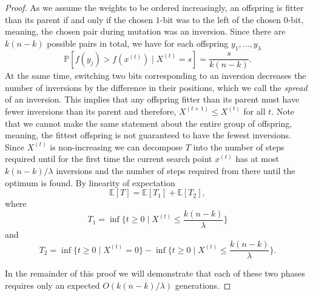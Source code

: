 \begin{proof}
    As we assume the weights to be ordered increasingly, an offspring is fitter than its parent if and only if the chosen $1$-bit was to the left of the chosen $0$-bit, meaning, the chosen pair during mutation was an inversion. Since there are $k(n-k)$ possible pairs in total, we have for each offspring $y_1, ..., y_{\lambda}$
    \begin{displaymath}
        \mathbb{P}[f(y_j) > f(x^{(t)}) \;|\; X^{(t)}= s] = \frac{s}{k(n-k)}.
    \end{displaymath}
    At the same time, switching two bits corresponding to an inversion decreases the number of inversions by the difference in their positions, which we call the \emph{spread} of an inversion. This implies that any offspring fitter than its parent must have fewer inversions than its parent and therefore, $X^{(t+1)} \le X^{(t)}$ for all $t$. Note that we cannot make the same statement about the entire group of offspring, meaning, the fittest offspring is not guaranteed to have the fewest inversions. Since $X^{(t)}$ is non-increasing we can decompose $T$ into the number of steps required until for the first time the current search point $x^{(t)}$ has at most  $ k(n-k)/\lambda$ inversions and the number of steps required from there until the optimum is found. By linearity of expectation
    \begin{displaymath}
        \mathbb{E}[T] = \mathbb{E}[T_1] + \mathbb{E}[T_2],
    \end{displaymath}
    where
    \begin{displaymath}
    T_1 = \inf\{ t \ge 0 \mid X^{(t)} \le  \frac{k(n-k)}{\lambda}\}
    \end{displaymath}
    and
    \begin{displaymath}
        T_2= \inf\{ t \ge 0 \mid X^{(t)} = 0 \} - \inf\{ t \ge 0 \mid X^{(t)} \le \frac{k(n-k)}{\lambda} \}.
    \end{displaymath}

    In the remainder of this proof we will demonstrate that each of these two phases requires only an expected $O(k(n-k)/\lambda)$ generations.
    

\end{proof}
